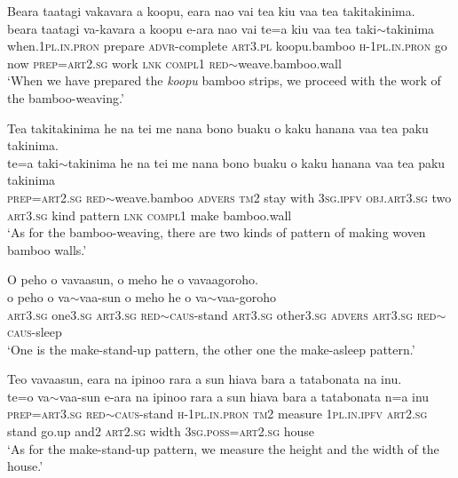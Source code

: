 \ea\label{ex:text14-25}
Beara taatagi vakavara a koopu, eara nao vai tea kiu vaa tea takitakinima.\\
\gll beara	taatagi	va-kavara	a	koopu	e-ara	nao	vai	te=a	kiu	vaa	tea	taki{$\sim$}takinima\\
     when.1\textsc{pl}.\textsc{in}.\textsc{pron}	prepare	\textsc{advr}-complete	\textsc{art}3.\textsc{pl}	koopu.bamboo	\textsc{h}-1\textsc{pl}.\textsc{in}.\textsc{pron}	go	now	\textsc{prep}=\textsc{art}2.\textsc{sg}	work	\textsc{lnk}	\textsc{compl}1	\textsc{red}{$\sim$}weave.bamboo.wall\\
\glt `When we have prepared the \textit{koopu} bamboo strips, we proceed with the work of the bamboo-weaving.'
\z

\ea\label{ex:text14-26}
Tea takitakinima he na tei me nana bono buaku o kaku hanana vaa tea paku takinima.\\
\gll te=a	taki{$\sim$}takinima	he	na	tei	me	nana	bono	buaku	o	kaku	hanana	vaa	tea	paku	takinima\\
     \textsc{prep}=\textsc{art}2.\textsc{sg}	\textsc{red}{$\sim$}weave.bamboo	\textsc{advers}	\textsc{tm}2	stay	with	3\textsc{sg}.\textsc{ipfv}	\textsc{obj}.\textsc{art}3.\textsc{sg}	two	\textsc{art}3.\textsc{sg}	kind	pattern	\textsc{lnk}	\textsc{compl}1	make	bamboo.wall\\
\glt `As for the bamboo-weaving, there are two kinds of pattern of making woven bamboo walls.'
\z

\newpage
\ea\label{ex:text14-27}
O peho o vavaasun, o meho he o vavaagoroho.\\
\gll o	peho	o	va{$\sim$}vaa-sun	o	meho	he	o	va{$\sim$}vaa-goroho\\
     \textsc{art}3.\textsc{sg}	one3.\textsc{sg}	\textsc{art}3.\textsc{sg}	\textsc{red}{$\sim$}\textsc{caus}-stand	\textsc{art}3.\textsc{sg}	other3.\textsc{sg}	\textsc{advers}	\textsc{art}3.\textsc{sg}	\textsc{red}{$\sim$}\textsc{caus}-sleep\\
\glt `One is the make-stand-up pattern, the other one the make-asleep pattern.'
\z

\ea\label{ex:text14-28}
Teo vavaasun, eara na ipinoo rara a sun hiava bara a tatabonata na inu.\\
\gll te=o	va{$\sim$}vaa-sun	e-ara	na	ipinoo	rara	a	sun	hiava	bara	a	tatabonata	n=a	inu\\
     \textsc{prep}=\textsc{art}3.\textsc{sg}	\textsc{red}{$\sim$}\textsc{caus}-stand	\textsc{h}-1\textsc{pl}.\textsc{in}.\textsc{pron}	\textsc{tm}2	measure	1\textsc{pl}.\textsc{in}.\textsc{ipfv}	\textsc{art}2.\textsc{sg}	stand	go.up	and2	\textsc{art}2.\textsc{sg}	width	3\textsc{sg}.\textsc{poss}=\textsc{art}2.\textsc{sg}	house\\
\glt `As for the make-stand-up pattern, we measure the height and the width of the house.'
\z

